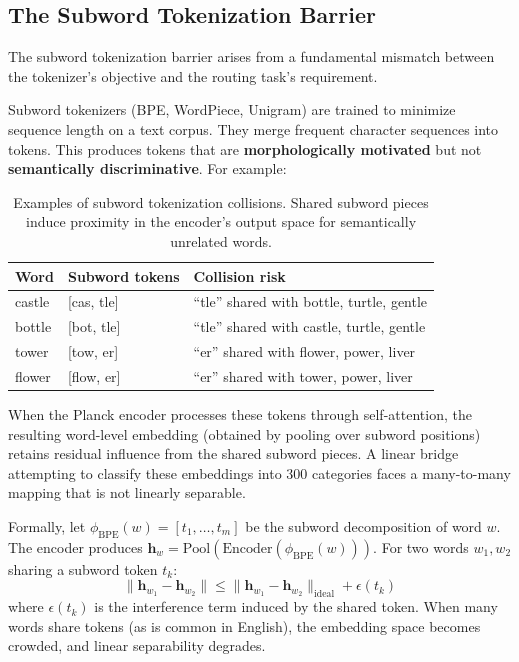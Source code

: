 \documentclass[11pt]{article}
\begin{document}
\subsection{The Subword Tokenization Barrier}
\label{sec:subword_barrier}

The subword tokenization barrier arises from a fundamental mismatch between the tokenizer's objective and the routing task's requirement.

Subword tokenizers (BPE, WordPiece, Unigram) are trained to minimize sequence length on a text corpus. They merge frequent character sequences into tokens. This produces tokens that are \textbf{morphologically motivated} but not \textbf{semantically discriminative}. For example:

\begin{table}[ht]
\centering
\begin{tabular}{@{}llp{6cm}@{}}
\toprule
Word & Subword tokens & Collision risk \\
\midrule
castle & [cas, tle] & ``tle'' shared with bottle, turtle, gentle \\
bottle & [bot, tle] & ``tle'' shared with castle, turtle, gentle \\
tower & [tow, er] & ``er'' shared with flower, power, liver \\
flower & [flow, er] & ``er'' shared with tower, power, liver \\
\bottomrule
\end{tabular}
\caption{Examples of subword tokenization collisions. Shared subword pieces induce proximity in the encoder's output space for semantically unrelated words.}
\label{tab:subword_collisions}
\end{table}

When the Planck encoder processes these tokens through self-attention, the resulting word-level embedding (obtained by pooling over subword positions) retains residual influence from the shared subword pieces. A linear bridge attempting to classify these embeddings into 300 categories faces a many-to-many mapping that is not linearly separable.

Formally, let $\phi_{\text{BPE}}(w) = [t_1, \ldots, t_m]$ be the subword decomposition of word $w$. The encoder produces $\mathbf{h}_w = \text{Pool}(\text{Encoder}(\phi_{\text{BPE}}(w)))$. For two words $w_1, w_2$ sharing a subword token $t_k$:
\begin{equation}
\|\mathbf{h}_{w_1} - \mathbf{h}_{w_2}\| \leq \|\mathbf{h}_{w_1} - \mathbf{h}_{w_2}\|_{\text{ideal}} + \epsilon(t_k)
\end{equation}
where $\epsilon(t_k)$ is the interference term induced by the shared token. When many words share tokens (as is common in English), the embedding space becomes crowded, and linear separability degrades.
\end{document}
